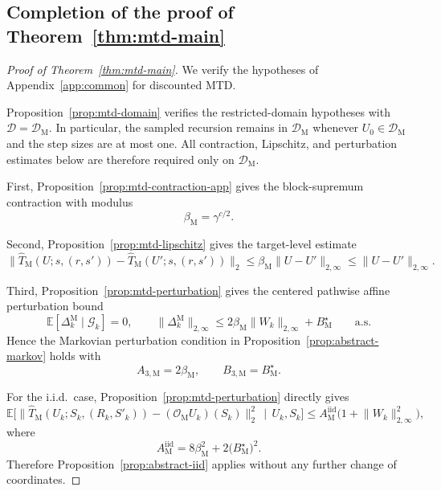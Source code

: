 \documentclass{article}
\begin{document}
\subsection{Completion of the proof of Theorem~\ref{thm:mtd-main}}

\begin{proof}[Proof of Theorem~\ref{thm:mtd-main}]
We verify the hypotheses of Appendix~\ref{app:common} for discounted MTD.

Proposition~\ref{prop:mtd-domain} verifies the restricted-domain hypotheses with $\mathcal D=\mathcal D_{\mathrm M}$. In particular, the sampled recursion remains in $\mathcal D_{\mathrm M}$ whenever $U_0\in\mathcal D_{\mathrm M}$ and the step sizes are at most one. All contraction, Lipschitz, and perturbation estimates below are therefore required only on $\mathcal D_{\mathrm M}$.

First, Proposition~\ref{prop:mtd-contraction-app} gives the block-supremum contraction with modulus
\begin{equation}
\beta_{\mathrm M} = \gamma^{c/2}.
\end{equation}

Second, Proposition~\ref{prop:mtd-lipschitz} gives the target-level estimate
\begin{equation}
\lVert \widehat T_{\mathrm M}(U;s,(r,s')) - \widehat T_{\mathrm M}(U';s,(r,s')) \rVert_2 \le \beta_{\mathrm M}\lVert U-U' \rVert_{2,\infty} \le \lVert U-U' \rVert_{2,\infty}.
\end{equation}

Third, Proposition~\ref{prop:mtd-perturbation} gives the centered pathwise affine perturbation bound
\begin{equation}
\mathbb{E}\left[\Delta_k^{\mathrm M} \mid \mathcal G_k\right] = 0, \qquad \lVert \Delta_k^{\mathrm M} \rVert_{2,\infty} \le 2\beta_{\mathrm M}\lVert W_k \rVert_{2,\infty} + B_{\mathrm M}^\star \qquad \text{a.s.}
\end{equation}
Hence the Markovian perturbation condition in Proposition~\ref{prop:abstract-markov} holds with
\begin{equation}
A_{3,\mathrm M}=2\beta_{\mathrm M},\qquad B_{3,\mathrm M}=B_{\mathrm M}^\star.
\end{equation}

For the i.i.d.\ case, Proposition~\ref{prop:mtd-perturbation} directly gives
\begin{equation}
\mathbb{E}\bigl[ \lVert \widehat T_{\mathrm M}(U_k;S_k,(R_k,S'_k)) - (\mathcal O_{\mathrm M}U_k)(S_k) \rVert_2^2 \,\mid\, U_k,S_k \bigr] \le A_{\mathrm M}^{\mathrm{iid}}\bigl(1+\lVert W_k\rVert_{2,\infty}^2\bigr),
\end{equation}
where
\begin{equation}
A_{\mathrm M}^{\mathrm{iid}}=8\beta_{\mathrm M}^2+2\bigl(B_{\mathrm M}^\star\bigr)^2.
\end{equation}
Therefore Proposition~\ref{prop:abstract-iid} applies without any further change of coordinates.


\end{proof}
\end{document}

